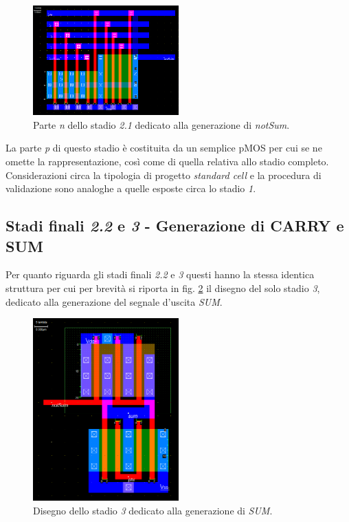 \begin{figure}[hbt!]
	\centering
	\includegraphics[width=0.5\textwidth]{figure/Msk_NMOS_NotSum.png}
	\caption{Parte \textit{n} dello stadio \textit{2.1} dedicato alla generazione di \textit{notSum}.}
	\label{fig:NMOSnotSum}
\end{figure} 

La parte \textit{p} di questo stadio è costituita da un semplice pMOS per cui se ne omette la rappresentazione, così come di quella relativa allo stadio completo. Considerazioni circa la tipologia di progetto \textit{standard cell} e la procedura di validazione sono analoghe a quelle esposte circa lo stadio \textit{1}.

\subsection{Stadi finali \textit{2.2} e \textit{3} - Generazione di CARRY e SUM}

Per quanto riguarda gli stadi finali \textit{2.2} e \textit{3} questi hanno la stessa identica struttura per cui per brevità si riporta in fig. \ref{fig:sum} il disegno del solo stadio \textit{3}, dedicato alla generazione del segnale d'uscita \textit{SUM}.

\begin{figure}[hbt!]
	\centering
	\includegraphics[width=0.5\textwidth]{figure/Msk_SumInveter.png}
	\caption{Disegno dello stadio \textit{3} dedicato alla generazione di \textit{SUM}.}
	\label{fig:sum}
\end{figure} 

